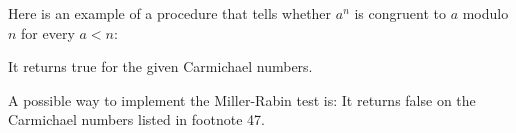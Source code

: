\begin{exe} %
    Here is an example of a procedure that tells whether $a^n$ is congruent to 
    $a$ modulo $n$ for every $a < n$:

    It returns true for the given Carmichael numbers.
\end{exe}

\begin{exe} %
    A possible way to implement the Miller-Rabin test is:
    It returns false on the Carmichael numbers listed in footnote 47.
\end{exe}

